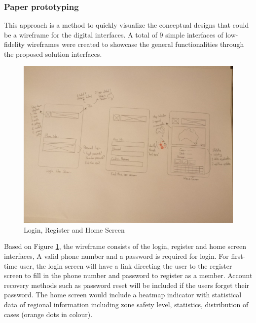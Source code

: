    \subsubsection{Paper prototyping}
      \par This approach is a method to quickly visualize the conceptual designs that could be a wireframe for
      the digital interfaces. A total of 9 simple interfaces of low-fidelity wireframes were created to
      showcase the general functionalities through the proposed solution interfaces.
      \begin{figure}[H]
        \centering
        \includegraphics[width=\linewidth]{img/low-fidelity-prototype/sketch-1.png}
        \caption{Login, Register and Home Screen}
        \label{fig:prototype-01}
      \end{figure}
      
      \par Based on Figure \ref{fig:prototype-01}, the wireframe consists of the login, register and home screen interfaces, A valid phone number and a password is required for login. For first-time user, the login screen will have a link directing the user to the register screen to fill in the phone number and password to register as a member. Account recovery methods such as password reset will be included if the users forget their password. The home screen would include a heatmap indicator with statistical data of regional information including zone safety level, statistics, distribution of cases (orange dots in colour).
      
